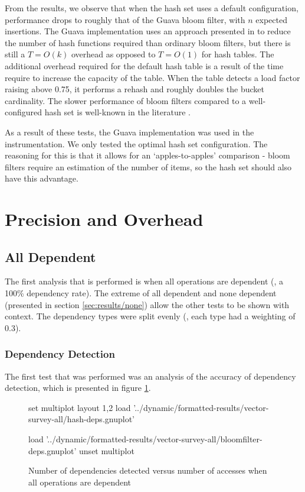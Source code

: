From the results, we observe that when the hash set uses a default configuration, performance drops to roughly that of the Guava bloom filter, with $n$ expected insertions. The Guava implementation uses an approach presented in \citet{Kirsch2006} to reduce the number of hash functions required than ordinary bloom filters, but there is still a $T=O(k)$ overhead as opposed to $T=O(1)$ for hash tables. The additional overhead required for the default hash table is a result of the time require to increase the capacity of the table. When the table detects a load factor raising above 0.75, it performs a rehash and roughly doubles the bucket cardinality. The slower performance of bloom filters compared to a well-configured hash set is well-known in the literature \citep{Dillinger2004,Sanchez2007a}.

As a result of these tests, the Guava implementation was used in the instrumentation. We only tested the optimal hash set configuration. The reasoning for this is that it allows for an `apples-to-apples' comparison - bloom filters require an estimation of the number of items, so the hash set should also have this advantage.

\section{Precision and Overhead} \label{sec:result/pre-overhead}
	\subsection{All Dependent} \label{sec:result/all}
		The first analysis that is performed is when all operations are dependent (\ie, a 100\% dependency rate). The extreme of all dependent and none dependent (presented in section \ref{sec:results/none}) allow the other tests to be shown with context. The dependency types were split evenly (\ie, each type had a weighting of 0.3).
	
		\subsubsection{Dependency Detection} \label{sec:results/all/deps}
		The first test that was performed was an analysis of the accuracy of dependency detection, which is presented in figure \ref{chart:all-dep}.
		
		\begin{figure}
			\centering
			\begin{gnuplot}[terminal=pdf]
				set multiplot layout 1,2
					load '../dynamic/formatted-results/vector-survey-all/hash-deps.gnuplot'
					
					load '../dynamic/formatted-results/vector-survey-all/bloomfilter-deps.gnuplot'
				unset multiplot
			\end{gnuplot}
			\caption{Number of dependencies detected versus number of accesses when all operations are dependent}
			\label{chart:all-dep}
		\end{figure}
		

